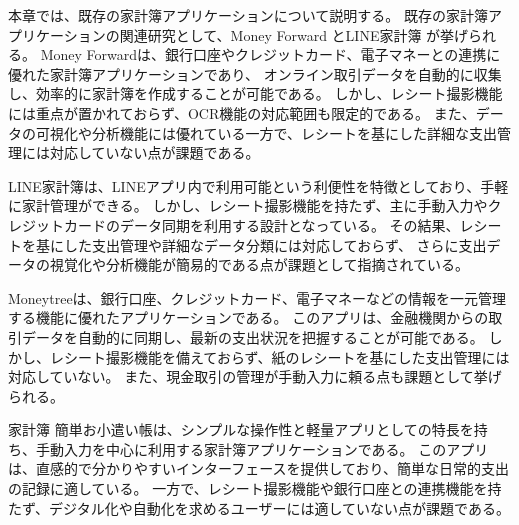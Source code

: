 \documentclass[main]{subfiles}
\begin{document}


本章では、既存の家計簿アプリケーションについて説明する。
既存の家計簿アプリケーションの関連研究として、Money Forward \cite{}とLINE家計簿\cite{} が挙げられる。
Money Forward\cite{MoneyForwardApp}は、銀行口座やクレジットカード、電子マネーとの連携に優れた家計簿アプリケーションであり、
オンライン取引データを自動的に収集し、効率的に家計簿を作成することが可能である。
しかし、レシート撮影機能には重点が置かれておらず、OCR機能の対応範囲も限定的である。
また、データの可視化や分析機能には優れている一方で、レシートを基にした詳細な支出管理には対応していない点が課題である。

LINE家計簿\cite{LINEKakeibo}は、LINEアプリ内で利用可能という利便性を特徴としており、手軽に家計管理ができる。
しかし、レシート撮影機能を持たず、主に手動入力やクレジットカードのデータ同期を利用する設計となっている。
その結果、レシートを基にした支出管理や詳細なデータ分類には対応しておらず、
さらに支出データの視覚化や分析機能が簡易的である点が課題として指摘されている。

Moneytree\cite{MoneytreeApp}は、銀行口座、クレジットカード、電子マネーなどの情報を一元管理する機能に優れたアプリケーションである。
このアプリは、金融機関からの取引データを自動的に同期し、最新の支出状況を把握することが可能である。
しかし、レシート撮影機能を備えておらず、紙のレシートを基にした支出管理には対応していない。
また、現金取引の管理が手動入力に頼る点も課題として挙げられる。

家計簿 簡単お小遣い帳\cite{KakeiboSimpleApp}は、シンプルな操作性と軽量アプリとしての特長を持ち、手動入力を中心に利用する家計簿アプリケーションである。
このアプリは、直感的で分かりやすいインターフェースを提供しており、簡単な日常的支出の記録に適している。
一方で、レシート撮影機能や銀行口座との連携機能を持たず、デジタル化や自動化を求めるユーザーには適していない点が課題である。
\end{document}
